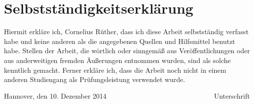 \documentclass[a4paper,11pt,twoside,openany]{book}
\theoremstyle{definition}
\theoremstyle{remark}
\newcommand{\<}{\langle}
\renewcommand{\>}{\rangle}
\renewcommand{\(}{\left(}
\renewcommand{\)}{\right)}
\newcommand{\nameofchapter}{}
\begin{document}
\listofalgorithms

\lstlistoflistings

\mainmatter


\setcounter{page}{11}


\pagestyle{fancy}{
	\fancyhead[LO,RE]{}
	\fancyhead[LE,RO]{\sl\thechapter. \nameofchapter}
	\renewcommand{\headheight}{14pt}
	\renewcommand{\footrulewidth}{0.4pt}
	\cfoot{\thepage}
}










\nocite{*}


\newpage

\pagestyle{fancy}{
	\fancyhead[LO,RE]{}
	\fancyhead[LE,RO]{\sl\thechapter. \nameofchapter}
	\renewcommand{\headheight}{14pt}
	\renewcommand{\footrulewidth}{0.4pt}
	\cfoot{\thepage}
}



\newpage
{}


\printindex

\chapter*{Selbstständigkeitserklärung}

Hiermit erkläre ich, Cornelius Rüther, dass ich diese Arbeit selbstständig verfasst habe und keine anderen als die angegebenen Quellen und Hilfsmittel benutzt habe. Stellen der Arbeit, die wörtlich oder sinngemäß aus Veröffentlichungen oder aus anderweitigen fremden Äußerungen entnommen wurden, sind als solche kenntlich gemacht. Ferner erkläre ich, dass die Arbeit noch nicht in einem anderen Studiengang als Prüfungsleistung verwendet wurde.

\vspace{1.8cm}

\noindent
Hannover, den 10. Dezember 2014 \hspace{1.27cm} \underline{$\qquad\qquad\qquad\qquad\qquad\qquad\qquad\quad$} \newline \text{$\, \quad$ } \hspace{8cm} Unterschrift

\backmatter
\end{document}
